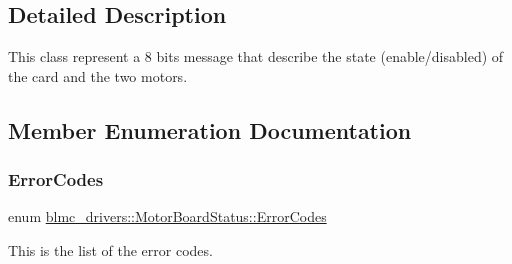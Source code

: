 \subsection{Detailed Description}
This class represent a 8 bits message that describe the state (enable/disabled) of the card and the two motors. 

\subsection{Member Enumeration Documentation}
\mbox{\label{classblmc__drivers_1_1MotorBoardStatus_a9fd931e24550f5e5877d7a6cf499f6cf}} 
\subsubsection{\texorpdfstring{Error\+Codes}{ErrorCodes}}
{\footnotesize\ttfamily enum \hyperlink{classblmc__drivers_1_1MotorBoardStatus_a9fd931e24550f5e5877d7a6cf499f6cf}{blmc\+\_\+drivers\+::\+Motor\+Board\+Status\+::\+Error\+Codes}}



This is the list of the error codes. 

